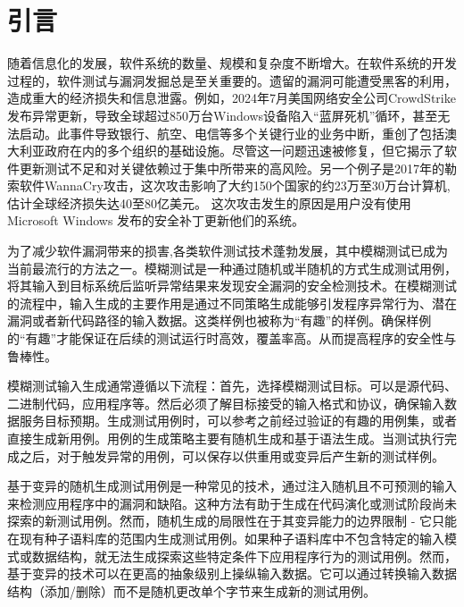 \documentclass[10.5pt,compsoc]{CjC}
\theoremstyle{mystyle}
\begin{document}
\clearpage\clearpage
\begin{strip}
\vspace {-13mm}
\end{strip}
    \linespread{1.15}
\heiti 
{}
\vskip 1mm

\section{引言}
\songti
随着信息化的发展，软件系统的数量、规模和复杂度不断增大。在软件系统的开发过程的，软件测试与漏洞发掘总是至关重要的。遗留的漏洞可能遭受黑客的利用，造成重大的经济损失和信息泄露。例如，2024年7月美国网络安全公司CrowdStrike发布异常更新，导致全球超过850万台Windows设备陷入“蓝屏死机”循环，甚至无法启动。此事件导致银行、航空、电信等多个关键行业的业务中断，重创了包括澳大利亚政府在内的多个组织的基础设施。尽管这一问题迅速被修复，但它揭示了软件更新测试不足和对关键依赖过于集中所带来的高风险\cite{Jones}。另一个例子是2017年的勒索软件WannaCry攻击，这次攻击影响了大约150个国家的约23万至30万台计算机,估计全球经济损失达40至80亿美元。 这次攻击发生的原因是用户没有使用 Microsoft Windows 发布的安全补丁更新他们的系统\cite{Maria}。

为了减少软件漏洞带来的损害,各类软件测试技术蓬勃发展，其中模糊测试已成为当前最流行的方法之一。模糊测试是一种通过随机或半随机的方式生成测试用例，将其输入到目标系统后监听异常结果来发现安全漏洞的安全检测技术。在模糊测试的流程中，输入生成的主要作用是通过不同策略生成能够引发程序异常行为、潜在漏洞或者新代码路径的输入数据。这类样例也被称为“有趣”的样例。确保样例的“有趣”才能保证在后续的测试运行时高效，覆盖率高。从而提高程序的安全性与鲁棒性。

模糊测试输入生成通常遵循以下流程：首先，选择模糊测试目标。可以是源代码、二进制代码，应用程序等。然后必须了解目标接受的输入格式和协议，确保输入数据服务目标预期。生成测试用例时，可以参考之前经过验证的有趣的用例集，或者直接生成新用例。用例的生成策略主要有随机生成和基于语法生成。当测试执行完成之后，对于触发异常的用例，可以保存以供重用或变异后产生新的测试样例。 

基于变异的随机生成测试用例\cite{LibFuzzer, Chenyang, Shuitao}是一种常见的技术，通过注入随机且不可预测的输入来检测应用程序中的漏洞和缺陷。这种方法有助于生成在代码演化或测试阶段尚未探索的新测试用例。然而，随机生成的局限性在于其变异能力的边界限制 - 它只能在现有种子语料库的范围内生成测试用例。如果种子语料库中不包含特定的输入模式或数据结构，就无法生成探索这些特定条件下应用程序行为的测试用例。然而，基于变异的技术可以在更高的抽象级别上操纵输入数据。它可以通过转换输入数据结构（添加/删除）而不是随机更改单个字节来生成新的测试用例。
\end{document}
